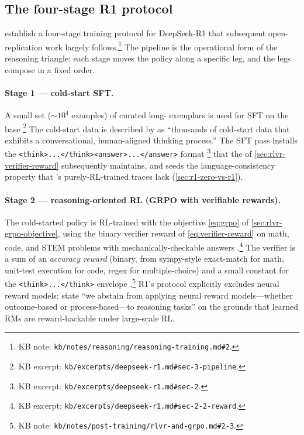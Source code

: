 \subsection{The four-stage R1 protocol}
\label{sec:r1-fourstage}

\citet[\S 2.3]{deepseek-r1} establish a four-stage training protocol
for DeepSeek-R1 that subsequent open-replication work largely
follows.\footnote{KB note:
\nolinkurl{kb/notes/reasoning/reasoning-training.md#2}.} The pipeline is
the operational form of the reasoning triangle: each stage moves the
policy along a specific leg, and the legs compose in a fixed order.

\paragraph{Stage 1 --- cold-start SFT.} A small set
($\sim\!10^4$ examples) of curated long- exemplars is used for SFT
on the  base \citep[\S
3]{deepseek-r1}\footnote{KB excerpt:
\nolinkurl{kb/excerpts/deepseek-r1.md#sec-3-pipeline}.} The cold-start
data is described by \citet[\S 3]{deepseek-r1} as
``thousands of cold-start data that exhibits a conversational,
human-aligned thinking process.'' The SFT pass installs the
\texttt{<think>...</think><answer>...</answer>} format
\citep[\S 2]{deepseek-r1}\footnote{KB excerpt:
\nolinkurl{kb/excerpts/deepseek-r1.md#sec-2}.} that the  of
\cref{sec:rlvr-verifier-reward} subsequently maintains, and seeds the
language-consistency property that 's purely-RL-trained traces
lack (\cref{sec:r1-zero-vs-r1}).

\paragraph{Stage 2 --- reasoning-oriented RL (GRPO with verifiable
rewards).} The cold-started policy is RL-trained with the 
objective \cref{eq:grpo} of \cref{sec:rlvr-grpo-objective}, using the
binary verifier reward of \cref{eq:verifier-reward} on math, code,
and STEM problems with mechanically-checkable answers
\citep[\S 2.2]{deepseek-r1}.\footnote{KB excerpt:
\nolinkurl{kb/excerpts/deepseek-r1.md#sec-2-2-reward}.} The verifier is
a sum of an \emph{accuracy reward} (binary, from sympy-style
exact-match for math, unit-test execution for code, regex for
multiple-choice) and a small constant \emph{} for the
\texttt{<think>...</think>} envelope
\citep[\S 2.2]{deepseek-r1}.\footnote{KB note:
\nolinkurl{kb/notes/post-training/rlvr-and-grpo.md#2-3}.} R1's protocol
explicitly excludes neural reward models: \citet[\S
2.2]{deepseek-r1} state ``we abstain from applying neural reward
models---whether outcome-based or process-based---to reasoning tasks''
on the grounds that learned RMs are reward-hackable under large-scale
RL.

